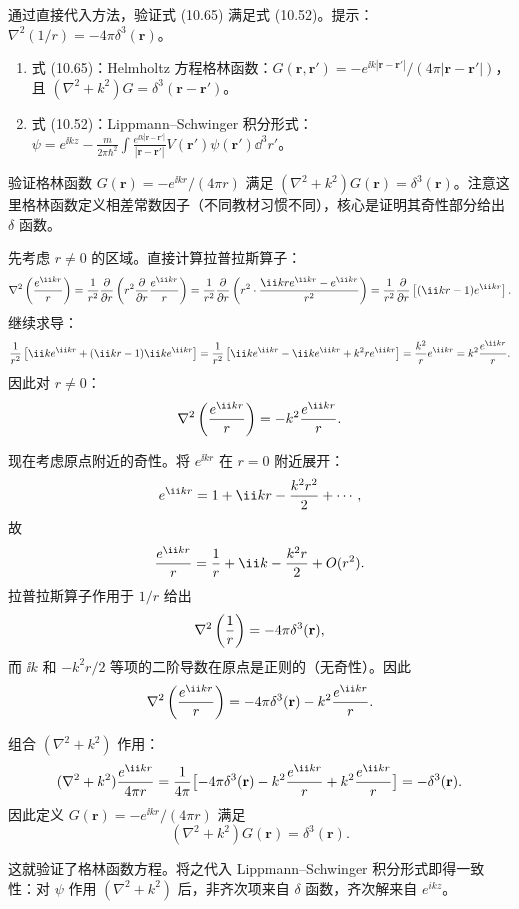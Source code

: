 \begin{question}
通过直接代入方法，验证式 (10.65) 满足式 (10.52)。提示：$\nabla^2(1/r)=-4\pi\delta^3(\mathbf r)$。

\par\smallskip
{}
\begin{enumerate}[leftmargin=2.2em,itemsep=0.12em,topsep=0.12em,parsep=0pt]
\item 式 (10.65)：Helmholtz 方程格林函数：$G(\mathbf r,\mathbf r')=-e^{\ii k|\mathbf r-\mathbf r'|}/(4\pi|\mathbf r-\mathbf r'|)$，且 $(\nabla^2+k^2)G=\delta^3(\mathbf r-\mathbf r')$。
\item 式 (10.52)：Lippmann--Schwinger 积分形式：$\psi=e^{\ii kz}-\frac{m}{2\pi\hbar^2}\int \frac{e^{\ii k|\mathbf r-\mathbf r'|}}{|\mathbf r-\mathbf r'|}V(\mathbf r')\psi(\mathbf r')\dd^3r'$。
\end{enumerate}

\end{question}
\begin{solution}
验证格林函数 $G(\mathbf r)=-e^{\ii kr}/(4\pi r)$ 满足 $(\nabla^2+k^2)G(\mathbf r)=\delta^3(\mathbf r)$。注意这里格林函数定义相差常数因子（不同教材习惯不同），核心是证明其奇性部分给出 $\delta$ 函数。

先考虑 $r\neq0$ 的区域。直接计算拉普拉斯算子：
\[
\nabla^2\left({e^{\ii kr}\over r}\right)
={1\over r^2}{\partial\over\partial r}\left(r^2{\partial\over\partial r}{e^{\ii kr}\over r}\right)
={1\over r^2}{\partial\over\partial r}\left(r^2\cdot{\ii kr e^{\ii kr}-e^{\ii kr}\over r^2}\right)
={1\over r^2}{\partial\over\partial r}\left[(\ii kr-1)e^{\ii kr}\right].
\]
继续求导：
\[
{1\over r^2}\left[\ii k e^{\ii kr}+(\ii kr-1)\ii k e^{\ii kr}\right]
={1\over r^2}\left[\ii k e^{\ii kr}-\ii k e^{\ii kr}+k^2r e^{\ii kr}\right]
={k^2\over r}e^{\ii kr}=k^2{e^{\ii kr}\over r}.
\]
因此对 $r\neq0$：
\[
\nabla^2\left({e^{\ii kr}\over r}\right)=-k^2{e^{\ii kr}\over r}.
\]

现在考虑原点附近的奇性。将 $e^{\ii kr}$ 在 $r=0$ 附近展开：
\[
e^{\ii kr}=1+\ii kr-{k^2r^2\over2}+\cdots,
\]
故
\[
{e^{\ii kr}\over r}={1\over r}+\ii k-{k^2r\over2}+O(r^2).
\]
拉普拉斯算子作用于 $1/r$ 给出
\[
\nabla^2\left({1\over r}\right)=-4\pi\delta^3(\mathbf r),
\]
而 $\ii k$ 和 $-k^2r/2$ 等项的二阶导数在原点是正则的（无奇性）。因此
\[
\nabla^2\left({e^{\ii kr}\over r}\right)=-4\pi\delta^3(\mathbf r)-k^2{e^{\ii kr}\over r}.
\]

组合 $(\nabla^2+k^2)$ 作用：
\[
(\nabla^2+k^2){e^{\ii kr}\over 4\pi r}
={1\over4\pi}\bigl[-4\pi\delta^3(\mathbf r)-k^2{e^{\ii kr}\over r}+k^2{e^{\ii kr}\over r}\bigr]
=-\delta^3(\mathbf r).
\]
因此定义 $G(\mathbf r)=-e^{\ii kr}/(4\pi r)$ 满足
\[
\boxed{(\nabla^2+k^2)G(\mathbf r)=\delta^3(\mathbf r).}
\]

这就验证了格林函数方程。将之代入 Lippmann--Schwinger 积分形式即得一致性：对 $\psi$ 作用 $(\nabla^2+k^2)$ 后，非齐次项来自 $\delta$ 函数，齐次解来自 $e^{ikz}$。
\end{solution}


